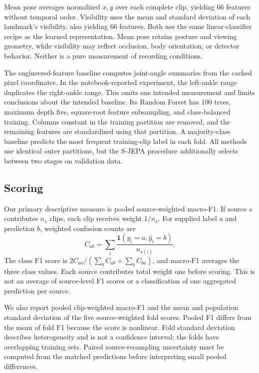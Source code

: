 \documentclass[10pt,twocolumn,letterpaper]{article}
\begin{document}
Mean pose averages normalized $x,y$ over each complete clip, yielding 66 features without temporal order. Visibility uses the mean and standard deviation of each landmark's visibility, also yielding 66 features. Both use the same linear-classifier recipe as the learned representation. Mean pose retains posture and viewing geometry, while visibility may reflect occlusion, body orientation, or detector behavior. Neither is a pure measurement of recording conditions.

The engineered-feature baseline computes joint-angle summaries from the cached pixel coordinates. In the notebook-reported experiment, the left-ankle range duplicates the right-ankle range. This omits one intended measurement and limits conclusions about the intended baseline. Its Random Forest has 100 trees, maximum depth five, square-root feature subsampling, and class-balanced training. Columns constant in the training partition are removed, and the remaining features are standardized using that partition. A majority-class baseline predicts the most frequent training-clip label in each fold. All methods use identical outer partitions, but the S-JEPA procedure additionally selects between two stages on validation data.

\subsection{Scoring}
Our primary descriptive measure is pooled source-weighted macro-F1. If source $s$ contributes $n_s$ clips, each clip receives weight $1/n_s$. For supplied label $a$ and prediction $b$, weighted confusion counts are
\begin{equation}
C_{ab}=\sum_i \frac{\mathbf{1}(y_i=a,\widehat{y}_i=b)}{n_{s(i)}}.
\end{equation}
The class F1 score is $2C_{aa}/(\sum_b C_{ab}+\sum_b C_{ba})$, and macro-F1 averages the three class values. Each source contributes total weight one before scoring. This is not an average of source-level F1 scores or a classification of one aggregated prediction per source.

We also report pooled clip-weighted macro-F1 and the mean and population standard deviation of the five source-weighted fold scores. Pooled F1 differs from the mean of fold F1 because the score is nonlinear. Fold standard deviation describes heterogeneity and is not a confidence interval; the folds have overlapping training sets. Paired source-resampling uncertainty must be computed from the matched predictions before interpreting small pooled differences.
\end{document}
